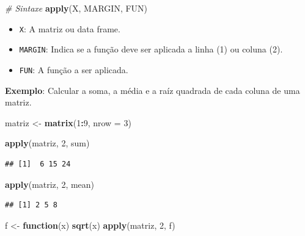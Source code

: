 \documentclass[
]{book}
\newenvironment{Shaded}{\begin{snugshade}}{\end{snugshade}}
\newcommand{\AttributeTok}[1]{\textcolor[rgb]{0.13,0.29,0.53}{#1}}
\newcommand{\CommentTok}[1]{\textcolor[rgb]{0.56,0.35,0.01}{\textit{#1}}}
\newcommand{\ControlFlowTok}[1]{\textcolor[rgb]{0.13,0.29,0.53}{\textbf{#1}}}
\newcommand{\DecValTok}[1]{\textcolor[rgb]{0.00,0.00,0.81}{#1}}
\newcommand{\FunctionTok}[1]{\textcolor[rgb]{0.13,0.29,0.53}{\textbf{#1}}}
\newcommand{\NormalTok}[1]{#1}
\newcommand{\OtherTok}[1]{\textcolor[rgb]{0.56,0.35,0.01}{#1}}
\newcommand{\SpecialCharTok}[1]{\textcolor[rgb]{0.81,0.36,0.00}{\textbf{#1}}}
\theoremstyle{definition}
\theoremstyle{definition}
\theoremstyle{definition}
\theoremstyle{definition}
\theoremstyle{remark}
\begin{document}
\begin{Shaded}
\begin{Highlighting}[]
\CommentTok{\# Sintaxe}
\FunctionTok{apply}\NormalTok{(X, MARGIN, FUN)}
\end{Highlighting}
\end{Shaded}

\begin{itemize}
\item
  \texttt{X}: A matriz ou data frame.
\item
  \texttt{MARGIN}: Indica se a função deve ser aplicada a linha (1) ou coluna (2).
\item
  \texttt{FUN}: A função a ser aplicada.
\end{itemize}

\textbf{Exemplo}: Calcular a soma, a média e a raíz quadrada de cada coluna de uma matriz.

\begin{Shaded}
\begin{Highlighting}[]
\NormalTok{matriz }\OtherTok{\textless{}{-}} \FunctionTok{matrix}\NormalTok{(}\DecValTok{1}\SpecialCharTok{:}\DecValTok{9}\NormalTok{, }\AttributeTok{nrow =} \DecValTok{3}\NormalTok{)}

\FunctionTok{apply}\NormalTok{(matriz, }\DecValTok{2}\NormalTok{, sum)}
\end{Highlighting}
\end{Shaded}

\begin{verbatim}
## [1]  6 15 24
\end{verbatim}

\begin{Shaded}
\begin{Highlighting}[]
\FunctionTok{apply}\NormalTok{(matriz, }\DecValTok{2}\NormalTok{, mean)}
\end{Highlighting}
\end{Shaded}

\begin{verbatim}
## [1] 2 5 8
\end{verbatim}

\begin{Shaded}
\begin{Highlighting}[]
\NormalTok{f }\OtherTok{\textless{}{-}} \ControlFlowTok{function}\NormalTok{(x) }\FunctionTok{sqrt}\NormalTok{(x)}
\FunctionTok{apply}\NormalTok{(matriz, }\DecValTok{2}\NormalTok{, f)}
\end{Highlighting}
\end{Shaded}
\end{document}

